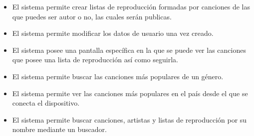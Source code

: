 \documentclass[12pt]{article}%
\begin{document}
\begin{itemize}
	\item  El sistema permite crear listas de reproducción formadas por canciones de las que puedes ser autor o no, las cuales serán publicas.
	\item  El sistema permite modificar los datos de usuario una vez creado.
	\item  El sistema posee una pantalla específica en la que se puede ver las canciones que posee una lista de reproducción así como seguirla.
	\item  El sistema permite buscar las canciones más populares de un género.
	\item  El sistema permite ver las canciones más populares en el país desde el que se conecta el dispositivo.
	\item  El sistema permite buscar canciones, artistas y listas de reproducción por su nombre mediante un buscador.
\end{itemize}
\end{document}
